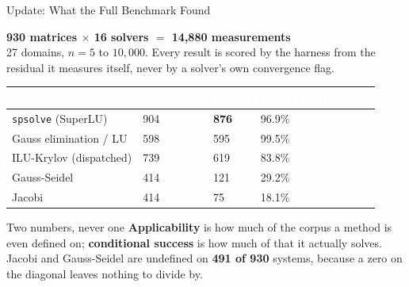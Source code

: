 \documentclass[aspectratio=169,10pt]{beamer}
\renewcommand{\emph}[1]{{\color{LSteal}\bfseries #1}}
\newcommand{\hdrow}{\rowcolor{LSnavy}}
\newcommand{\hdtxt}[1]{\textcolor{white}{\bfseries #1}}
\begin{document}
\begin{frame}{Update: What the Full Benchmark Found}
  \vspace{-0.15em}
  \colorbox{LSlightgold}{\parbox{0.98\linewidth}{\vspace{0.25em}
    {\bfseries\normalsize\color{LSnavy} 930 matrices $\times$ 16 solvers $=$ 14{,}880 measurements}\\[0.15em]
    {\footnotesize\color{LSgray} 27 domains, $n = 5$ to $10{,}000$. Every result is scored by the
    harness from the residual it measures itself, never by a solver's own convergence flag.}
    \vspace{0.25em}}}
  \vspace{0.5em}
  \small
  \renewcommand{\arraystretch}{1.25}
  \begin{tabular}{@{}p{4.5cm}p{2.1cm}p{1.9cm}p{3.1cm}@{}}
    \toprule
    \hdrow \hdtxt{Solver} & \hdtxt{Applicable} & \hdtxt{Solved} & \hdtxt{Conditional success}\\
    \midrule
    \texttt{spsolve} (SuperLU) & 904 & \textcolor{LSgreen}{\textbf{876}} & 96.9\%\\
    \rowcolor{LSlight}
    Gauss elimination / LU & 598 & 595 & 99.5\%\\
    ILU-Krylov (dispatched) & 739 & 619 & 83.8\%\\
    \rowcolor{LSlight}
    Gauss-Seidel & 414 & 121 & 29.2\%\\
    Jacobi & 414 & 75 & 18.1\%\\
    \bottomrule
  \end{tabular}
  \vspace{0.6em}
  \begin{block}{\small Two numbers, never one}
    \footnotesize \emph{Applicability} is how much of the corpus a method is even defined on;
    \emph{conditional success} is how much of that it actually solves. Jacobi and Gauss-Seidel
    are undefined on \textbf{491 of 930} systems, because a zero on the diagonal leaves nothing
    to divide by.
  \end{block}
\end{frame}
\end{document}
